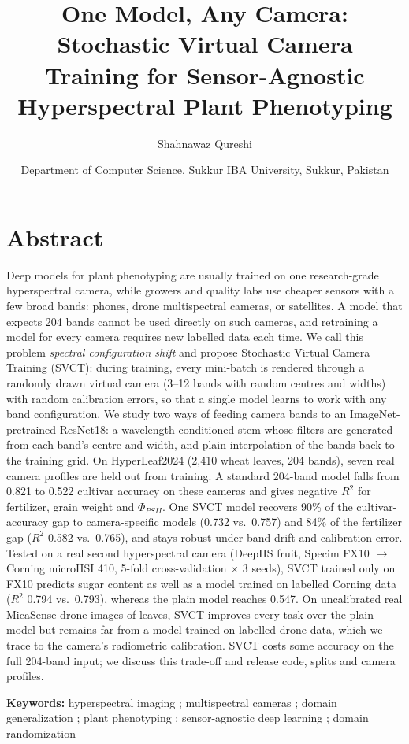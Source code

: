 \documentclass[preprint,12pt,authoryear]{elsarticle}
\newenvironment{frontmatter}{}{}
\newcommand{\affiliation}[1]{\date{#1}}
\newcommand{\sep}{; }
\renewenvironment{abstract}{\maketitle\section*{Abstract}}{}
\newenvironment{keyword}{\par\noindent\textbf{Keywords:} }{\par}
\begin{document}
\begin{frontmatter}

\title{One Model, Any Camera: Stochastic Virtual Camera Training for Sensor-Agnostic Hyperspectral Plant Phenotyping}

\author{Shahnawaz Qureshi}
\affiliation{Department of Computer Science, Sukkur IBA University, Sukkur, Pakistan}

\begin{abstract}
Deep models for plant phenotyping are usually trained on one research-grade hyperspectral camera, while growers and
quality labs use cheaper sensors with a few broad bands: phones, drone multispectral cameras, or satellites. A model that
expects 204 bands cannot be used directly on such cameras, and retraining a model for every camera requires new labelled
data each time. We call this problem \emph{spectral configuration shift} and propose Stochastic Virtual Camera Training
(SVCT): during training, every mini-batch is rendered through a randomly drawn virtual camera (3--12 bands with random
centres and widths) with random calibration errors, so that a single model learns to work with any band configuration. We
study two ways of feeding camera bands to an ImageNet-pretrained ResNet18: a wavelength-conditioned stem whose filters are
generated from each band's centre and width, and plain interpolation of the bands back to the training grid. On
HyperLeaf2024 (2,410 wheat leaves, 204 bands), seven real camera profiles are held out from training. A standard
204-band model falls from 0.821 to 0.522 cultivar accuracy on these cameras and gives negative $R^2$ for fertilizer,
grain weight and $\Phi_{PSII}$. One SVCT model recovers 90\% of the cultivar-accuracy gap to camera-specific models
(0.732 vs.\ 0.757) and 84\% of the fertilizer gap ($R^2$ 0.582 vs.\ 0.765), and stays robust under band drift and
calibration error. Tested on a real second hyperspectral camera (DeepHS fruit, Specim FX10 $\rightarrow$ Corning
microHSI 410, 5-fold cross-validation $\times$ 3 seeds), SVCT trained only on FX10 predicts sugar content as well as a
model trained on labelled Corning data ($R^2$ 0.794 vs.\ 0.793), whereas the plain model reaches 0.547. On uncalibrated
real MicaSense drone images of leaves, SVCT improves every task over the plain model but remains far from a model trained
on labelled drone data, which we trace to the camera's radiometric calibration. SVCT costs some accuracy on the full
204-band input; we discuss this trade-off and release code, splits and camera profiles.
\end{abstract}

\begin{keyword}
hyperspectral imaging \sep multispectral cameras \sep domain generalization \sep plant phenotyping \sep sensor-agnostic deep learning \sep domain randomization
\end{keyword}

\end{frontmatter}
\end{document}
